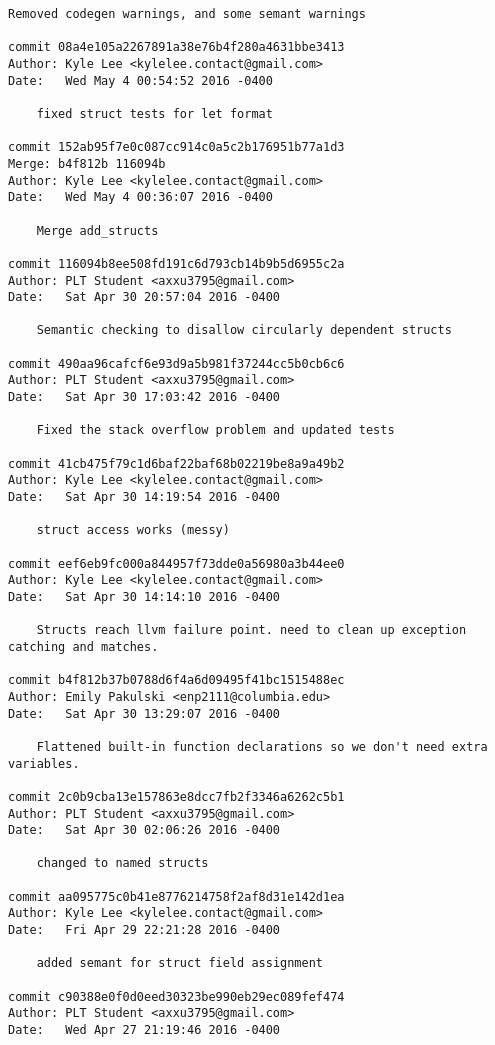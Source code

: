 \begin{lstlisting}[backgroundcolor=\color{white}]
    Removed codegen warnings, and some semant warnings

commit 08a4e105a2267891a38e76b4f280a4631bbe3413
Author: Kyle Lee <kylelee.contact@gmail.com>
Date:   Wed May 4 00:54:52 2016 -0400

    fixed struct tests for let format

commit 152ab95f7e0c087cc914c0a5c2b176951b77a1d3
Merge: b4f812b 116094b
Author: Kyle Lee <kylelee.contact@gmail.com>
Date:   Wed May 4 00:36:07 2016 -0400

    Merge add_structs

commit 116094b8ee508fd191c6d793cb14b9b5d6955c2a
Author: PLT Student <axxu3795@gmail.com>
Date:   Sat Apr 30 20:57:04 2016 -0400

    Semantic checking to disallow circularly dependent structs

commit 490aa96cafcf6e93d9a5b981f37244cc5b0cb6c6
Author: PLT Student <axxu3795@gmail.com>
Date:   Sat Apr 30 17:03:42 2016 -0400

    Fixed the stack overflow problem and updated tests

commit 41cb475f79c1d6baf22baf68b02219be8a9a49b2
Author: Kyle Lee <kylelee.contact@gmail.com>
Date:   Sat Apr 30 14:19:54 2016 -0400

    struct access works (messy)

commit eef6eb9fc000a844957f73dde0a56980a3b44ee0
Author: Kyle Lee <kylelee.contact@gmail.com>
Date:   Sat Apr 30 14:14:10 2016 -0400

    Structs reach llvm failure point. need to clean up exception catching and matches.

commit b4f812b37b0788d6f4a6d09495f41bc1515488ec
Author: Emily Pakulski <enp2111@columbia.edu>
Date:   Sat Apr 30 13:29:07 2016 -0400

    Flattened built-in function declarations so we don't need extra variables.

commit 2c0b9cba13e157863e8dcc7fb2f3346a6262c5b1
Author: PLT Student <axxu3795@gmail.com>
Date:   Sat Apr 30 02:06:26 2016 -0400

    changed to named structs

commit aa095775c0b41e8776214758f2af8d31e142d1ea
Author: Kyle Lee <kylelee.contact@gmail.com>
Date:   Fri Apr 29 22:21:28 2016 -0400

    added semant for struct field assignment

commit c90388e0f0d0eed30323be990eb29ec089fef474
Author: PLT Student <axxu3795@gmail.com>
Date:   Wed Apr 27 21:19:46 2016 -0400


\end{lstlisting}
